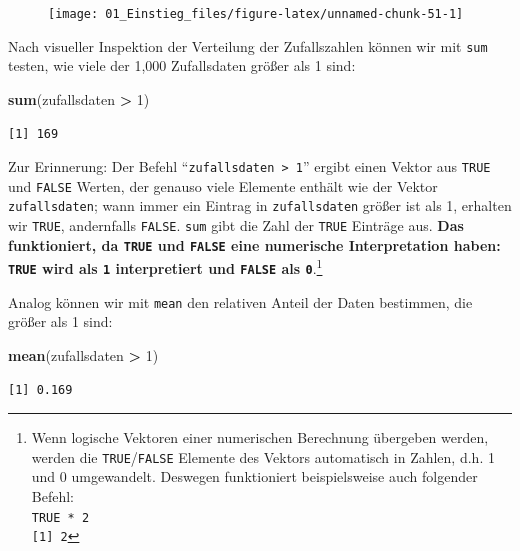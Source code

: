 \documentclass[12pt,]{tufte-book}
\newenvironment{Shaded}{\begin{snugshade}}{\end{snugshade}}
\newcommand{\KeywordTok}[1]{\textcolor[rgb]{0.13,0.29,0.53}{\textbf{#1}}}
\newcommand{\DecValTok}[1]{\textcolor[rgb]{0.00,0.00,0.81}{#1}}
\newcommand{\StringTok}[1]{\textcolor[rgb]{0.31,0.60,0.02}{#1}}
\newcommand{\OperatorTok}[1]{\textcolor[rgb]{0.81,0.36,0.00}{\textbf{#1}}}
\newcommand{\NormalTok}[1]{#1}
\theoremstyle{definition}
\theoremstyle{definition}
\theoremstyle{definition}
\theoremstyle{remark}
\begin{document}
\begin{figure}

{\centering \texttt{[image: 01\_Einstieg\_files/figure-latex/unnamed-chunk-51-1]} 

}

\end{figure}

Nach visueller Inspektion der Verteilung der Zufallszahlen können wir
mit \texttt{sum} testen, wie viele der 1,000 Zufallsdaten größer als 1
sind:

\begin{Shaded}
\begin{Highlighting}[]
\KeywordTok{sum}\NormalTok{(zufallsdaten }\OperatorTok{>}\StringTok{ }\DecValTok{1}\NormalTok{)}
\end{Highlighting}
\end{Shaded}

\begin{verbatim}
[1] 169
\end{verbatim}

Zur Erinnerung: Der Befehl ``\texttt{zufallsdaten\ \textgreater{}\ 1}''
ergibt einen Vektor aus \texttt{TRUE} und \texttt{FALSE} Werten, der
genauso viele Elemente enthält wie der Vektor \texttt{zufallsdaten};
wann immer ein Eintrag in \texttt{zufallsdaten} größer ist als 1,
erhalten wir \texttt{TRUE}, andernfalls \texttt{FALSE}. \texttt{sum}
gibt die Zahl der \texttt{TRUE} Einträge aus. \textbf{Das funktioniert,
da \texttt{TRUE} und \texttt{FALSE} eine numerische Interpretation
haben: \texttt{TRUE} wird als \texttt{1} interpretiert und
\texttt{FALSE} als \texttt{0}}.\footnote{Wenn logische Vektoren einer
  numerischen Berechnung übergeben werden, werden die
  \texttt{TRUE}/\texttt{FALSE} Elemente des Vektors automatisch in
  Zahlen, d.h. 1 und 0 umgewandelt. Deswegen funktioniert beispielsweise
  auch folgender Befehl:\\
  \texttt{TRUE\ *\ 2}\\
  \texttt{{[}1{]}\ 2}}

Analog können wir mit \texttt{mean} den relativen Anteil der Daten
bestimmen, die größer als 1 sind:

\begin{Shaded}
\begin{Highlighting}[]
\KeywordTok{mean}\NormalTok{(zufallsdaten }\OperatorTok{>}\StringTok{ }\DecValTok{1}\NormalTok{)}
\end{Highlighting}
\end{Shaded}

\begin{verbatim}
[1] 0.169
\end{verbatim}
\end{document}
